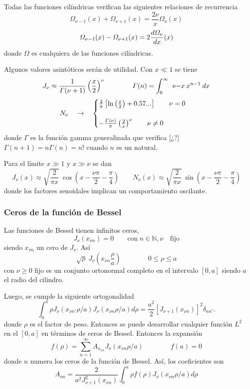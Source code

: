 \documentclass[10pt,oneside]{CBFT_book}
\begin{document}
Todas las funciones cilíndricas verifican las siguientes relaciones de recurrencia
\[
	\Omega_{\nu-1}(x) + \Omega_{\nu+1}(x) = \frac{2\nu}{x} \Omega_{\nu}(x)
\]
\[
	\Omega_{\nu-1}(x) - \Omega_{\nu+1}(x) = 2 \frac{d^{\hspace{-0.05em}} { \Omega_{\nu} }}{d { x }^{\hspace{-0.05em}}}(x)
\]
donde $\Omega$ es cualquiera de las funciones cilíndricas.

Algunos valores asintóticos serán de utilidad. Con $ x \ll 1$ se tiene
\[
	J_\nu \approx \frac{1}{\Gamma(\nu+1)} \left( \frac{ x }{ 2 } \right)^\nu \qquad \qquad 
	\Gamma(n) = \int_0^\infty \: \:\mathrm{e}{-x} \: x^{n-1} \: dx
\]
\[
	N_\nu \quad \to \quad \begin{cases}
			\frac{2}{\pi}\left[ \ln\left( \frac{ x }{ 2 } \right) + 0.57... \right]  \qquad \nu=0 \\
			\\
			- \frac{\Gamma(\nu)}{\pi}\left( \frac{ 2 }{ x } \right)^\nu  \qquad \nu\neq 0
	             \end{cases}
\]
donde $\Gamma$ es la función gamma generalizada que verifica [¿?]
$\Gamma(n+1) = n \Gamma(n) = n!$ cuando $n$ es un natural.

Para el límite $ x \gg 1 $ y $ x \gg \nu$ se dan
\[
	J_\nu(x) \approx \sqrt{ \frac{2}{\pi x} } \: \cos\left( x - \frac{\nu \pi}{2} - \frac{\pi}{4} \right) \qquad 
	N_\nu(x) \approx \sqrt{ \frac{2}{\pi x} } \: \sin\left( x - \frac{\nu \pi}{2} - \frac{\pi}{4} \right)
\]
donde los factores senoidales implican un comportamiento oscilante.

\subsubsection{Ceros de la función de Bessel}

Las funciones de Bessel tienen infinitos ceros,
\[
	J_\nu(x_{\nu n}) = 0 \qquad \mathrm{con} \; n\in\mathbb{N}, \nu \quad \mathrm{fijo} 
\]
siendo $x_{\nu n}$ un cero de $J_\nu$. Así
\[
	\sqrt{\rho} \: J_\nu\left( x_{\nu n} \frac \rho a \right) \qquad\qquad 0 \leq \rho \leq a
\]
con $\nu \geq 0$ fijo es un conjunto ortonormal completo en el intervalo $[0,a]$ siendo $a$ 
el radio del cilindro.

Luego, se cumple la siguiente ortogonalidad
\[
	\int_0^a \rho  J_\nu (x_{\nu n'} \rho/a)  J_\nu (x_{\nu n} \rho/a)  d\rho = 
	\frac{a^2}{2}[J_{\nu+1}(x_{\nu n})]^2 \delta_{nn'}.
\]
donde $\rho$ es el factor de peso. Entonces se puede desarrollar cualquier función $L^2$ en el $[0,a]$
en términos de ceros de Bessel.
Entonces la expansión
\[
	f(\rho) = \sum_{n=1}^{\infty}  A_{x_{\nu n}} J_{\nu}( x_{\nu n} \rho/a ) \qquad \qquad 
	f(a) = 0
\]
donde $n$ numera los ceros de la función de Bessel.
Así, los coeficientes son
\[
	A_{\nu n} = \frac{2}{a^2 J_{\nu +1}^2 (x_{\nu n})} 
	\int_0^a \rho f(\rho) J_\nu (x_{\nu n} \rho/a) 	d\rho
\]
\end{document}
